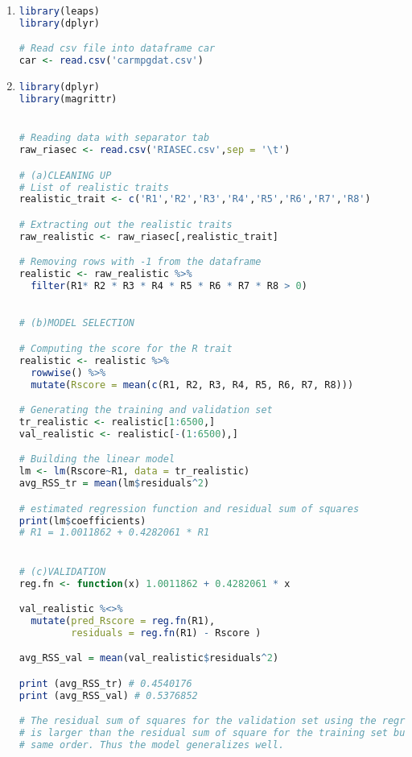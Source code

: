 \documentclass[a4paper,10pt]{article}
\theoremstyle{definition}
\begin{document}
\begin{enumerate}
\item


\begin{lstlisting}[language=R,commentstyle=\fontseries{lc}\color{gray}]
library(leaps)
library(dplyr)

# Read csv file into dataframe car
car <- read.csv('carmpgdat.csv')
\end{lstlisting}


\item
\begin{lstlisting}[language=R,commentstyle=\fontseries{lc}\color{gray}]
library(dplyr)
library(magrittr)


# Reading data with separator tab
raw_riasec <- read.csv('RIASEC.csv',sep = '\t')

# (a)CLEANING UP
# List of realistic traits
realistic_trait <- c('R1','R2','R3','R4','R5','R6','R7','R8')

# Extracting out the realistic traits
raw_realistic <- raw_riasec[,realistic_trait]

# Removing rows with -1 from the dataframe
realistic <- raw_realistic %>%
  filter(R1* R2 * R3 * R4 * R5 * R6 * R7 * R8 > 0)
  

# (b)MODEL SELECTION

# Computing the score for the R trait
realistic <- realistic %>%
  rowwise() %>%
  mutate(Rscore = mean(c(R1, R2, R3, R4, R5, R6, R7, R8))) 

# Generating the training and validation set 
tr_realistic <- realistic[1:6500,]
val_realistic <- realistic[-(1:6500),]

# Building the linear model
lm <- lm(Rscore~R1, data = tr_realistic)
avg_RSS_tr = mean(lm$residuals^2)

# estimated regression function and residual sum of squares
print(lm$coefficients)
# R1 = 1.0011862 + 0.4282061 * R1


# (c)VALIDATION
reg.fn <- function(x) 1.0011862 + 0.4282061 * x

val_realistic %<>%
  mutate(pred_Rscore = reg.fn(R1),
         residuals = reg.fn(R1) - Rscore )

avg_RSS_val = mean(val_realistic$residuals^2)

print (avg_RSS_tr) # 0.4540176
print (avg_RSS_val) # 0.5376852

# The residual sum of squares for the validation set using the regression function
# is larger than the residual sum of square for the training set but are of the
# same order. Thus the model generalizes well.




\end{lstlisting}
\end{enumerate}
\end{document}
